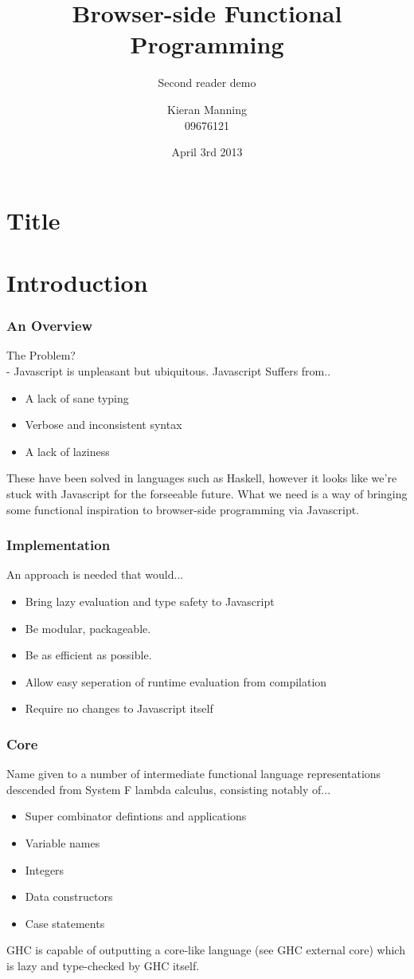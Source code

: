 \documentclass{beamer}
\title{Browser-side Functional Programming}
\subtitle{Second reader demo}
\date{April 3rd 2013}
\author{Kieran Manning \\ 09676121}
\begin{document}
\section{Title}

\frame{\titlepage}

\section{Introduction}
\begin{frame}
	\frametitle{An Overview}
	The Problem? \\
	- Javascript is unpleasant but ubiquitous. Javascript 
	Suffers from..
	\begin{itemize}
		\item A lack of sane typing
		\item Verbose and inconsistent syntax
		\item A lack of laziness
	\end{itemize}
	These have been solved in languages such as Haskell, however
	it looks like we're stuck with Javascript for the forseeable 
	future. What we need is a way of bringing some functional
	inspiration to browser-side programming via Javascript.
\end{frame}

\begin{frame}
	\frametitle{Implementation}
	An approach is needed that would...
	\begin{itemize}
		\item Bring lazy evaluation and type safety to Javascript
		\item Be modular, packageable.
		\item Be as efficient as possible.
		\item Allow easy seperation of runtime evaluation from 
		  	  compilation
		\item Require no changes to Javascript itself
	\end{itemize}
\end{frame}

\begin{frame}
	\frametitle{Core}
	Name given to a number of intermediate functional language
	representations descended from System F lambda calculus,
	consisting notably of...
	\begin{itemize}
		\item Super combinator defintions and applications
		\item Variable names
		\item Integers
		\item Data constructors
		\item Case statements
	\end{itemize}
	GHC is capable of outputting a core-like language (see
	GHC external core) which is lazy and type-checked by GHC
	itself.
\end{frame}
\end{document}
